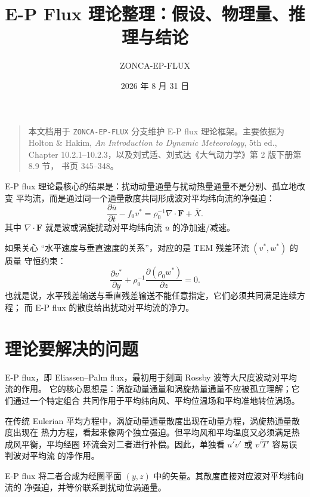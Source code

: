 \documentclass[UTF8,a4paper,12pt]{ctexart}
\title{\bfseries E-P Flux 理论整理：假设、物理量、推理与结论}
\author{ZONCA-EP-FLUX}
\date{2026 年 8 月 31 日}
\newcommand{\mean}[1]{\overline{#1}}
\newcommand{\p}{\partial}
\newcommand{\bF}{\bm{F}}
\begin{document}
\maketitle

\begin{quote}
本文档用于 \texttt{ZONCA-EP-FLUX} 分支维护 E-P flux 理论框架。主要依据为
Holton \& Hakim, \textit{An Introduction to Dynamic Meteorology}, 5th ed.,
Chapter 10.2.1--10.2.3，以及刘式适、刘式达《大气动力学》第 2 版下册第 8.9 节，
书页 345--348。
\end{quote}

\begin{tcolorbox}[
  title={最重要结论},
  colback=blue!3,
  colframe=blue!55!black,
  fonttitle=\bfseries,
  arc=1mm
]
E-P flux 理论最核心的结果是：扰动动量通量与扰动热量通量不是分别、孤立地改变
平均流，而是通过同一个通量散度共同形成波对平均纬向流的净强迫：
\begin{equation}
  \frac{\p\mean{u}}{\p t}
  -f_0 v^*
  =
  \rho_0^{-1}\nabla\cdot\bF+\mean{X}.
\end{equation}
其中 $\nabla\cdot\bF$ 就是波或涡旋扰动对平均纬向流 $\mean{u}$ 的净加速/减速。

如果关心 ``水平速度与垂直速度的关系''，对应的是 TEM 残差环流 $(v^*,w^*)$ 的质量
守恒约束：
\begin{equation}
  \frac{\p v^*}{\p y}
  +\rho_0^{-1}\frac{\p(\rho_0 w^*)}{\p z}=0.
\end{equation}
也就是说，水平残差输送与垂直残差输送不能任意指定，它们必须共同满足连续方程；
而 E-P flux 的散度给出扰动对平均流的净力。
\end{tcolorbox}

\section{理论要解决的问题}

E-P flux，即 Eliassen--Palm flux，最初用于刻画 Rossby 波等大尺度波动对平均流的作用。
它的核心思想是：涡旋动量通量和涡旋热量通量不应被孤立理解；它们通过一个特定组合
共同作用于平均纬向风、平均位温场和平均准地转位涡场。

在传统 Eulerian 平均方程中，涡旋动量通量散度出现在动量方程，涡旋热通量散度出现在
热力方程，看起来像两个独立强迫。但平均风和平均温度又必须满足热成风平衡，平均经圈
环流会对二者进行补偿。因此，单独看 $\mean{u'v'}$ 或 $\mean{v'T'}$ 容易误判波对平均流
的净作用。

E-P flux 将二者合成为经圈平面 $(y,z)$ 中的矢量。其散度直接对应波对平均纬向流的
净强迫，并等价联系到扰动位涡通量。
\end{document}
